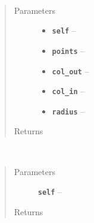 \documentclass[letterpaper,10pt,english]{sphinxmanual}
\begin{document}
\begin{fulllineitems}

\begin{fulllineitems}
\label{RRtoolbox.lib:RRtoolbox.lib.image.getCoors.drawstats}~\begin{quote}\begin{description}
\item[{Parameters}] \leavevmode\begin{itemize}
\item {} 
\textbf{\texttt{self}} -- 

\item {} 
\textbf{\texttt{points}} -- 

\item {} 
\textbf{\texttt{col\_out}} -- 

\item {} 
\textbf{\texttt{col\_in}} -- 

\item {} 
\textbf{\texttt{radius}} -- 

\end{itemize}

\item[{Returns}] \leavevmode


\end{description}\end{quote}

\end{fulllineitems}


\begin{fulllineitems}
\label{RRtoolbox.lib:RRtoolbox.lib.image.getCoors.mousefunc}~\begin{quote}\begin{description}
\item[{Parameters}] \leavevmode
\textbf{\texttt{self}} -- 

\item[{Returns}] \leavevmode


\end{description}\end{quote}

\end{fulllineitems}



\end{fulllineitems}
\end{document}
